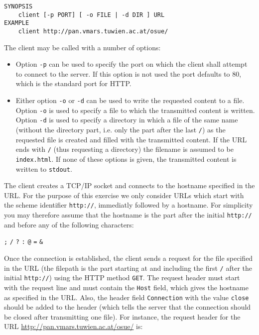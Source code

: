 \begin{verbatim}
SYNOPSIS
    client [-p PORT] [ -o FILE | -d DIR ] URL
EXAMPLE
    client http://pan.vmars.tuwien.ac.at/osue/
\end{verbatim}

The client may be called with a number of options:
\begin{itemize}
\item Option \texttt{-p} can be used to specify the port
on which the client shall attempt to connect to the server.
If this option is not used the port defaults to 80,
which is the standard port for HTTP.
\item Either option \texttt{-o} or \texttt{-d} can be used
to write the requested content to a file.
Option \texttt{-o} is used to specify a file
to which the transmitted content is written.
Option \texttt{-d} is used to specify a directory
in which a file of the same name
(without the directory part, i.e. only the part after the last \verb|/|)
as the requested file is created
and filled with the transmitted content.
If the URL ends with \verb|/| (thus requesting a directory)
the filename is assumed to be \verb|index.html|.
If none of these options is given,
the transmitted content is written to \verb|stdout|.
\end{itemize}

The client creates a TCP/IP socket
and connects to the hostname specified in the URL.
For the purpose of this exercise we only consider URLs
which start with the scheme identifier \verb|http://|,
immediatly followed by a hostname.
For simplicity you may therefore assume that
the hostname is the part after the initial \verb|http://|
and before any of the following characters:

\texttt{;} \texttt{/} \texttt{?} \texttt{:} \texttt{@} \texttt{=} \texttt{\&}

Once the connection is established,
the client sends a request for the file specified in the URL
(the filepath is the part starting at and including the first \texttt{/}
after the initial \verb|http://|)
using the HTTP method \texttt{GET}.
The request header must start with the request line
and must contain the \texttt{Host} field,
which gives the hostname as specified in the URL.
Also, the header field \verb|Connection| with the value \verb|close|
should be added to the header
(which tells the server that the connection should be closed after transmitting one file).
For instance, the request header for the URL
\url{http://pan.vmars.tuwien.ac.at/osue/} is:

